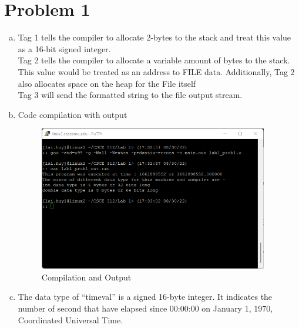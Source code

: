 \section*{Problem 1}
\begin{enumerate}[a)]
    \item Tag 1 tells the compiler to allocate 2-bytes to the stack and treat this value as a 16-bit signed integer.\\
    Tag 2 tells the compiler to allocate a variable amount of bytes to the stack. This value would be treated as an address to FILE data. Additionally, Tag 2 also allocates space on the heap for the File itself\\
    Tag 3 will send the formatted string to the file output stream.
    \item Code compilation with output
    \begin{figure}[h!]
        \centering
        \includegraphics[width=10cm]{Images/1b.png}
        \caption{Compilation and Output}
    \end{figure}
    
    \item The data type of ``timeval'' is a signed 16-byte integer. It indicates the number of second that have elapsed since 00:00:00 on January 1, 1970, Coordinated Universal Time.
\end{enumerate}